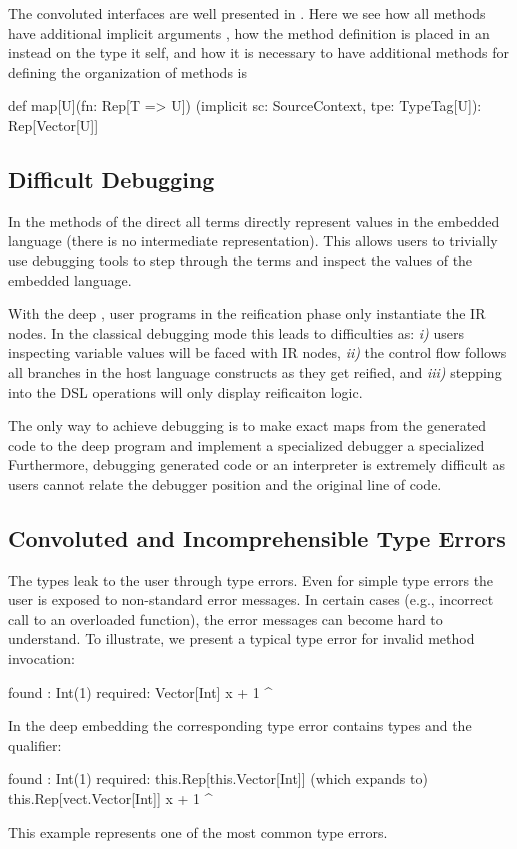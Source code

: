  The convoluted interfaces are well presented in . Here we see
  how all methods have additional implicit arguments , how the method
  definition is placed in an  instead on the type it self, and how
  it is necessary to have additional methods for defining the
  organization of methods is \begin{lstparagraph}
  def map[U](fn: Rep[T => U])
    (implicit sc: SourceContext, tpe: TypeTag[U]): Rep[Vector[U]]
 \end{lstparagraph}

\subsection{Difficult Debugging}
\label{sec:difficult-debugging}

In the methods of the direct \edsl{} all terms
 directly represent values in the embedded language (there is no intermediate
 representation). This allows users to trivially use debugging tools to step
 through the terms and inspect the values of the embedded language.

With the deep \edsl{}, user programs in the reification phase only instantiate the IR nodes. In the classical
 debugging mode this leads to difficulties as: \emph{i)} users inspecting variable values
 will be faced with IR nodes, \emph{ii)} the control flow follows all branches in
 the host language constructs as they get reified, and \emph{iii)} stepping into the
 DSL operations will only display reificaiton logic.

The only way to achieve debugging is to make exact maps from the generated code to
 the deep program and implement a specialized debugger a specialized  Furthermore, debugging generated code or an interpreter is extremely difficult as
 users cannot relate the debugger position and the original line of code.


\subsection{Convoluted and Incomprehensible Type Errors}
\label{sec:incomprehensible-type-errors}

The  types leak to the user through type errors. Even for simple type errors the user is exposed to non-standard error messages. In certain cases (e.g., incorrect call to an overloaded function), the error messages can become hard to understand. To illustrate, we present a typical type error for invalid method invocation:
\begin{lstparagraph}
  found   : Int(1)
  required: Vector[Int]
       x + 1
           ^
\end{lstparagraph}
In the deep embedding the corresponding type error contains  types and the  qualifier:
\begin{lstparagraph}
  found   : Int(1)
  required: this.Rep[this.Vector[Int]]
       (which expands to) this.Rep[vect.Vector[Int]]
       x + 1
           ^
\end{lstparagraph}
This example represents one of the  most common type errors.

